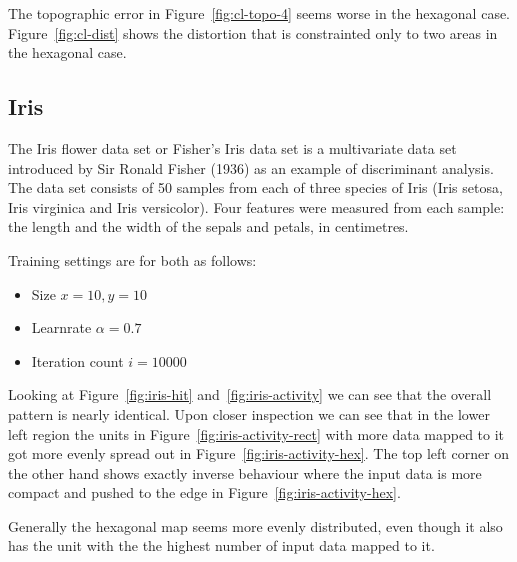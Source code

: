 \documentclass{acm_proc_article-sp}
\begin{document}

The topographic error in Figure~\ref{fig:cl-topo-4} seems worse in the hexagonal case. Figure~\ref{fig:cl-dist} shows the distortion that is constrainted only to two areas in the hexagonal case.

\subsection{Iris}
\label{sec:iris}

The Iris flower data set or Fisher's Iris data set is a multivariate data set introduced by Sir Ronald Fisher (1936) as an example of discriminant analysis.
The data set consists of 50 samples from each of three species of Iris (Iris setosa, Iris virginica and Iris versicolor). Four features were measured from each sample: the length and the width of the sepals and petals, in centimetres.

Training settings are for both as follows:
\begin{itemize}
  \item Size $x = 10, y = 10$
  \item Learnrate $\alpha = 0.7$
  \item Iteration count $i = 10000$
\end{itemize}


Looking at Figure~\ref{fig:iris-hit} and~\ref{fig:iris-activity} we can see that the overall pattern is nearly identical.
Upon closer inspection we can see that in the lower left region the units in Figure~\ref{fig:iris-activity-rect} with more data mapped to it
got more evenly spread out in Figure~\ref{fig:iris-activity-hex}. The top left corner on the other hand shows exactly inverse behaviour where the input data
is more compact and pushed to the edge in Figure~\ref{fig:iris-activity-hex}.

Generally the hexagonal map seems more evenly distributed, even though it also has the unit with the the highest number of input data mapped to it.

\end{document}
